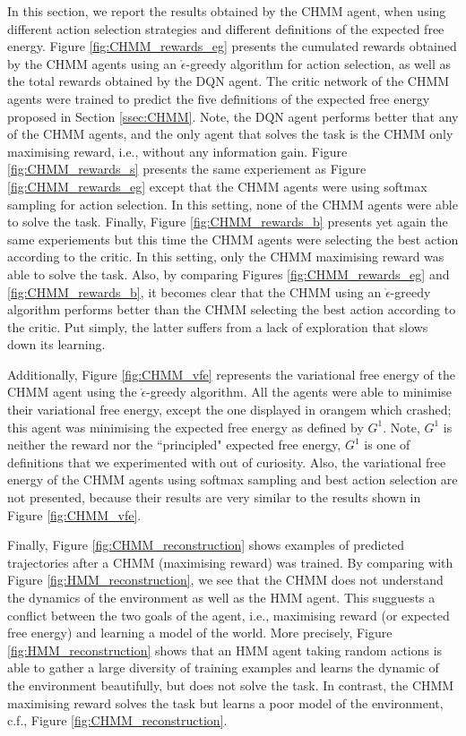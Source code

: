 \documentclass[twoside,11pt]{article}
\begin{document}
In this section, we report the results obtained by the CHMM agent, when using different action selection strategies and different definitions of the expected free energy. Figure \ref{fig:CHMM_rewards_eg} presents the cumulated rewards obtained by the CHMM agents using an $\mathring{\epsilon}$-greedy algorithm for action selection, as well as the total rewards obtained by the DQN agent. The critic network of the CHMM agents were trained to predict the five definitions of the expected free energy proposed in Section \ref{ssec:CHMM}. Note, the DQN agent performs better that any of the CHMM agents, and the only agent that solves the task is the CHMM only maximising reward, i.e., without any information gain. Figure \ref{fig:CHMM_rewards_s} presents the same experiement as Figure \ref{fig:CHMM_rewards_eg} except that the CHMM agents were using softmax sampling for action selection. In this setting, none of the CHMM agents were able to solve the task. Finally, Figure \ref{fig:CHMM_rewards_b} presents yet again the same experiements but this time the CHMM agents were selecting the best action according to the critic. In this setting, only the CHMM maximising reward was able to solve the task. Also, by comparing Figures \ref{fig:CHMM_rewards_eg} and \ref{fig:CHMM_rewards_b}, it becomes clear that the CHMM using an $\mathring{\epsilon}$-greedy algorithm performs better than the CHMM selecting the best action according to the critic. Put simply, the latter suffers from a lack of exploration that slows down its learning. 

Additionally, Figure \ref{fig:CHMM_vfe} represents the variational free energy of the CHMM agent using the $\mathring{\epsilon}$-greedy algorithm. All the agents were able to minimise their variational free energy, except the one displayed in orangem which crashed; this agent was minimising the expected free energy as defined by $G^1$. Note, $G^1$ is neither the reward nor the ``principled" expected free energy, $G^1$ is one of definitions that we experimented with out of curiosity. Also, the variational free energy of the CHMM agents using softmax sampling and best action selection are not presented, because their results are very similar to the results shown in Figure \ref{fig:CHMM_vfe}.

Finally, Figure \ref{fig:CHMM_reconstruction} shows examples of predicted trajectories after a CHMM (maximising reward) was trained. By comparing with Figure    \ref{fig:HMM_reconstruction}, we see that the CHMM does not understand the dynamics of the environment as well as the HMM agent. This sugguests a conflict between the two goals of the agent, i.e., maximising reward (or expected free energy) and learning a model of the world. More precisely, Figure \ref{fig:HMM_reconstruction} shows that an HMM agent taking random actions is able to gather a large diversity of training examples and learns the dynamic of the environment beautifully, but does not solve the task. In contrast, the CHMM maximising reward solves the task but learns a poor model of the environment, c.f., Figure \ref{fig:CHMM_reconstruction}.
\end{document}

